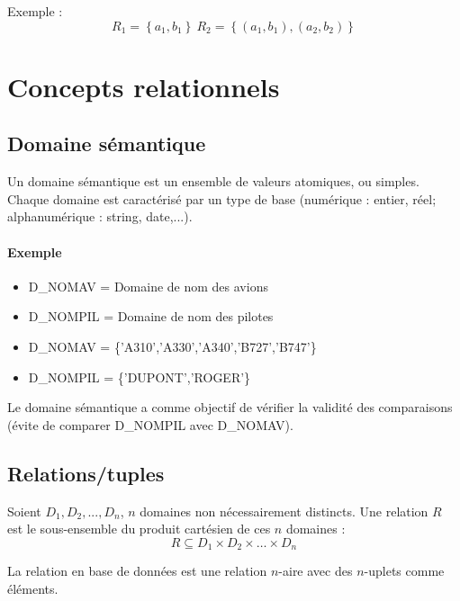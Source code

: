 \documentclass[10pt]{article}
\begin{document}
                Exemple :
                $$R_1=\left\{a_1,b_1\right\} \: R_2=\left\{(a_1,b_1),(a_2,b_2)\right\}$$

    \section{Concepts relationnels}
        \subsection{Domaine sémantique}
            Un domaine sémantique est un ensemble de valeurs atomiques, ou simples. Chaque domaine est caractérisé par un type de base (numérique : entier, réel; alphanumérique : string, date,...).

            \paragraph{Exemple}
                \begin{itemize}
                    \item D\_NOMAV = Domaine de nom des avions
                    \item D\_NOMPIL = Domaine de nom des pilotes
                    \\
                    \item D\_NOMAV = \{'A310','A330','A340','B727','B747'\}
                    \item D\_NOMPIL = \{'DUPONT','ROGER'\}
                \end{itemize}

            Le domaine sémantique a comme objectif de vérifier la validité des comparaisons (évite de comparer D\_NOMPIL avec D\_NOMAV).

        \subsection{Relations/tuples}
            Soient $D_1,D_2,...,D_n$, $n$ domaines non nécessairement distincts. Une relation $R$ est le sous-ensemble du produit cartésien de ces $n$ domaines :
            $$R\subseteq D_1\times D_2 \times \dots \times D_n$$

            La relation en base de données est une relation $n$-aire avec des $n$-uplets comme éléments.
\end{document}
